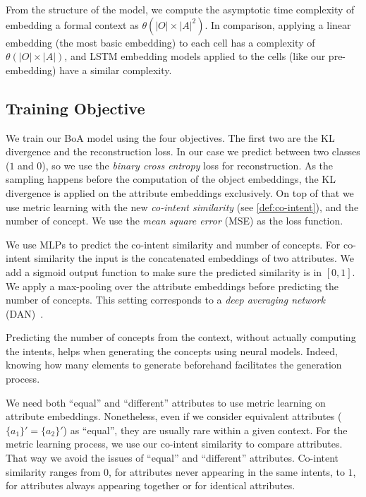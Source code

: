 From the structure of the model, we compute the asymptotic time complexity of embedding a formal context as $\theta(|O| \times |A|^2)$. In comparison, applying a linear embedding (the most basic embedding) to each cell has a complexity of $\theta(|O| \times |A|)$, and LSTM embedding models applied to the cells (like our pre-embedding) have a similar complexity.


\subsection{Training Objective}
We train our BoA model using the four objectives.
%
The first two are the KL divergence and the reconstruction loss.
In our case we predict between two classes ($1$ and $0$), so we use the \textit{binary cross entropy} loss for reconstruction.
As the sampling happens before the computation of the object embeddings, the KL divergence is applied on the attribute embeddings exclusively.
%
On top of that we use metric learning with the new \textit{co-intent similarity} (see \autoref{def:co-intent}), and the number of concept.
We use the \textit{mean square error} (MSE) as the loss function.

We use MLPs to predict the co-intent similarity and number of concepts.
For co-intent similarity the input is the concatenated embeddings of two attributes.
We add a sigmoid output function to make sure the predicted similarity is in $[0,1]$.
%
We apply a max-pooling over the attribute embeddings before predicting the number of concepts.
This setting corresponds to a \textit{deep averaging network} (DAN)~\cite{dan:2015:iyyer}.

Predicting the number of concepts from the context, without actually computing the intents, helps when generating the concepts using neural models.
Indeed, knowing how many elements to generate beforehand facilitates the generation process. 

We need both ``equal'' and ``different'' attributes to use metric learning on attribute embeddings.
Nonetheless, even if we consider equivalent attributes ($\{a_1\}' = \{a_2\}'$) as ``equal'', they are usually rare within a given context.
For the metric learning process, we use our co-intent similarity to compare attributes. That way we avoid the issues of ``equal'' and ``different'' attributes.
Co-intent similarity ranges from $0$, for attributes never appearing in the same intents, to $1$, for attributes always appearing together or for identical attributes.


